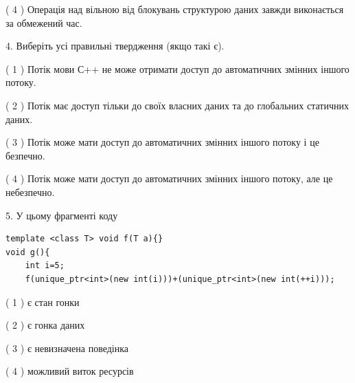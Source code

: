 \documentclass[12pt, ukrainian]{article}
\begin{document}
\begin {large}
{( 4 ) Операція над вільною від блокувань структурою даних завжди виконається за обмежений час.%


4. Виберіть усі правильні твердження (якщо такі є).\par


( 1 ) Потік мови С++ не може отримати доступ до автоматичних змінних іншого потоку.%

( 2 ) Потік має доступ тільки до своїх власних даних та до глобальних статичних даних.%

( 3 ) Потік може мати доступ до автоматичних змінних іншого потоку і це безпечно.%

( 4 ) Потік може мати доступ до автоматичних змінних іншого потоку, але це небезпечно.%


5. У цьому фрагменті коду
\begin{verbatim}
template <class T> void f(T a){}
void g(){
    int i=5;
    f(unique_ptr<int>(new int(i)))+(unique_ptr<int>(new int(++i)));
\end{verbatim}
( 1 ) є стан гонки%

( 2 ) є гонка даних%

( 3 ) є невизначена поведінка%

( 4 ) можливий виток ресурсів%
}
\end {large}
\end{document}
